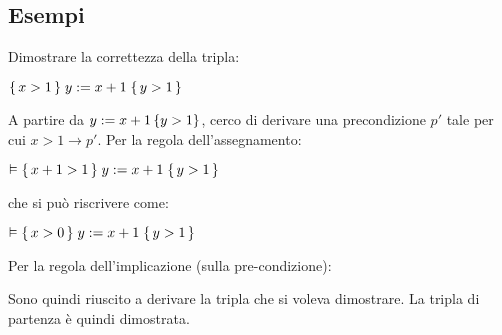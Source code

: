\subsection{Esempi}
\begin{exmp}
    Dimostrare la correttezza della tripla:
    \begin{center}
        $\Hoaretriple{x>1}{y:=x+1}{y>1}$
    \end{center}
    A partire da $y:=x+1 \cbra{y>1}$, cerco di derivare una precondizione
    $p'$ tale per cui $x>1 \rightarrow p'$.
    Per la regola dell'assegnamento:
    \begin{center}
        $\vDash \Hoaretriple{x+1>1}{y:=x+1}{y>1}$
    \end{center}
    che si può riscrivere come:
    \begin{center}
        $\vDash \Hoaretriple{x>0}{y:=x+1}{y>1}$
    \end{center}
    Per la regola dell'implicazione (sulla pre-condizione):
    \begin{center}
        \begin{prooftree}
        \end{prooftree}
    \end{center}
    Sono quindi riuscito a derivare la tripla che si voleva dimostrare.
    La tripla di partenza è quindi dimostrata.
\end{exmp}

